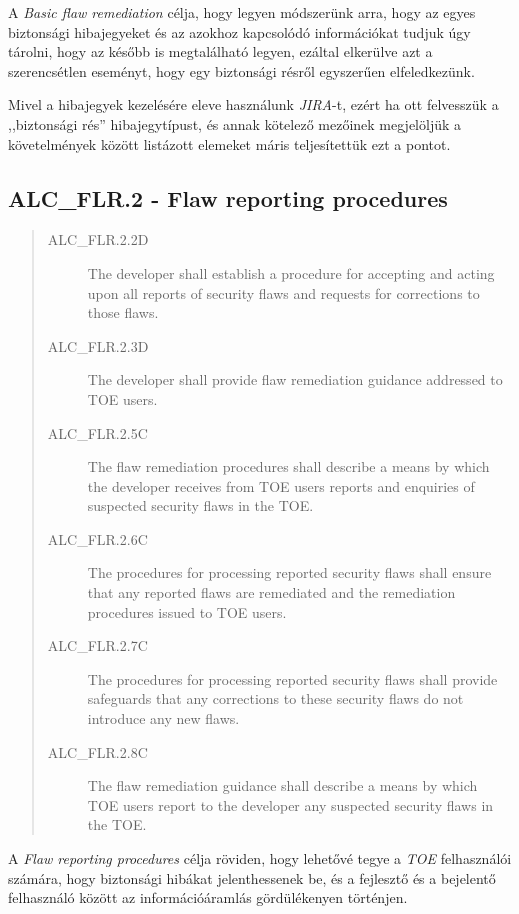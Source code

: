 A \emph{Basic flaw remediation} célja, hogy legyen módszerünk arra, hogy az egyes biztonsági
hibajegyeket és az azokhoz kapcsolódó információkat tudjuk úgy tárolni, hogy az később is
megtalálható legyen, ezáltal elkerülve azt a szerencsétlen eseményt, hogy egy biztonsági résről
egyszerűen elfeledkezünk.

Mivel a hibajegyek kezelésére eleve használunk \emph{JIRA}-t, ezért ha ott felvesszük a ,,biztonsági
rés'' hibajegytípust, és annak kötelező mezőinek megjelöljük a követelmények között listázott
elemeket máris teljesítettük ezt a pontot.

\subsection{ALC\_FLR.2 - Flaw reporting procedures}
\begin{quote}
    \begin{description}
        \item[ALC\_FLR.2.2D]{The developer shall establish a procedure for accepting and acting upon
            all reports of security flaws and requests for corrections to those flaws.}
        \item[ALC\_FLR.2.3D]{The developer shall provide flaw remediation guidance addressed to TOE
            users.}
        \item[ALC\_FLR.2.5C]{The flaw remediation procedures shall describe a means by which the
            developer receives from TOE users reports and enquiries of suspected security flaws in
            the TOE.}
        \item[ALC\_FLR.2.6C]{The procedures for processing reported security flaws shall ensure that
            any reported flaws are remediated and the remediation procedures issued to TOE users.}
        \item[ALC\_FLR.2.7C]{The procedures for processing reported security flaws shall provide
            safeguards that any corrections to these security flaws do not introduce any new flaws.}
        \item[ALC\_FLR.2.8C]{The flaw remediation guidance shall describe a means by which TOE users
            report to the developer any suspected security flaws in the TOE.}
    \end{description}
\end{quote}

A \emph{Flaw reporting procedures} célja röviden, hogy lehetővé tegye a \emph{TOE} felhasználói
számára, hogy biztonsági hibákat jelenthessenek be, és a fejlesztő és a bejelentő felhasználó
között az információáramlás gördülékenyen történjen.

